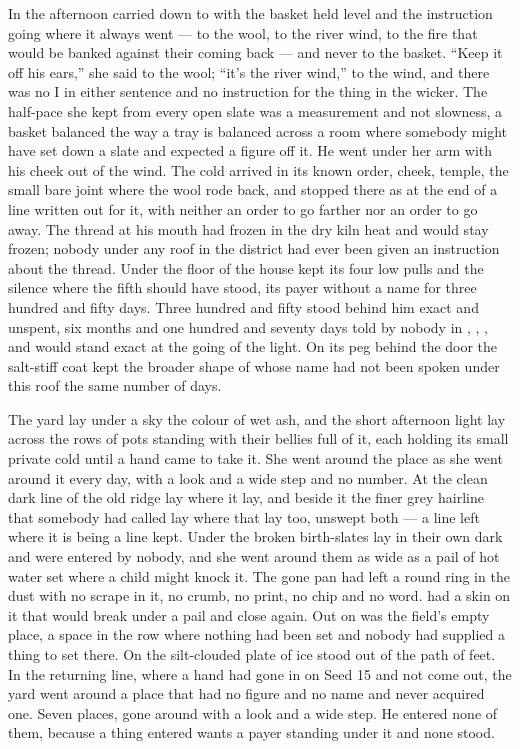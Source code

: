 In the afternoon  carried  down to  with the basket held level and the instruction going where it always went --- to the wool, to the river wind, to the fire that would be banked against their coming back --- and never to the basket. “Keep it off his ears,” she said to the wool; “it’s the river wind,” to the wind, and there was no I in either sentence and no instruction for the thing in the wicker. The half-pace she kept from every open slate was a measurement and not slowness, a basket balanced the way a tray is balanced across a room where somebody might have set down a slate and expected a figure off it. He went under her arm with his cheek out of the wind. The cold arrived in its known order, cheek, temple, the small bare joint where the wool rode back, and stopped there as at the end of a line written out for it, with neither an order to go farther nor an order to go away. The thread at his mouth had frozen in the dry kiln heat and would stay frozen; nobody under any roof in the district had ever been given an instruction about the thread. Under the floor of the house  kept its four low pulls and the silence where the fifth should have stood, its payer without a name for three hundred and fifty days. Three hundred and fifty stood behind him exact and unspent, six months and one hundred and seventy days told by nobody in , , , and would stand exact at the going of the light. On its peg behind the door the salt-stiff coat kept the broader shape of  whose name had not been spoken under this roof the same number of days.

The yard lay under a sky the colour of wet ash, and the short afternoon light lay across the rows of pots standing with their bellies full of it, each holding its small private cold until a hand came to take it. She went around the place as she went around it every day, with a look and a wide step and no number. At  the clean dark line of the old  ridge lay where it lay, and beside it the finer grey hairline that somebody had called  lay where that lay too, unswept both --- a line left where it is being a line kept. Under  the broken birth-slates lay in their own dark and were entered by nobody, and she went around them as wide as a pail of hot water set where a child might knock it. The gone pan had left a round ring in the dust with no scrape in it, no crumb, no print, no chip and no word.  had a skin on it that would break under a pail and close again. Out on  was the field’s empty place, a space in the row where nothing had been set and nobody had supplied a thing to set there. On  the silt-clouded plate of ice stood out of the path of feet. In the returning line, where a hand had gone in on Seed 15 and not come out, the yard went around a place that had no figure and no name and never acquired one. Seven places, gone around with a look and a wide step. He entered none of them, because a thing entered wants a payer standing under it and none stood.

